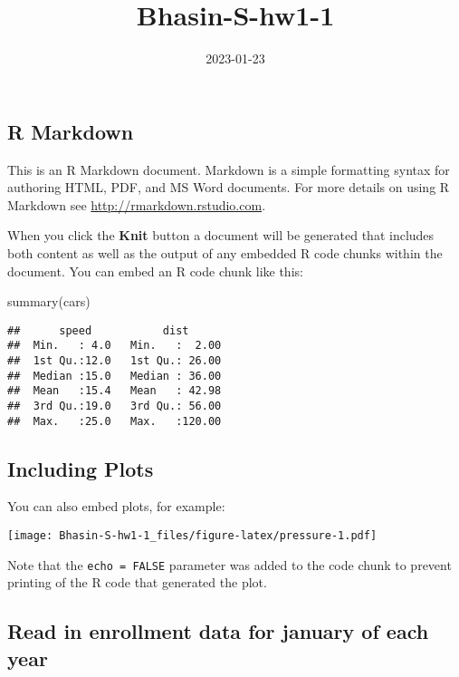 \documentclass[
]{article}
\title{Bhasin-S-hw1-1}
\author{}
\date{\vspace{-2.5em}2023-01-23}
\newenvironment{Shaded}{\begin{snugshade}}{\end{snugshade}}
\newcommand{\FunctionTok}[1]{\textcolor[rgb]{0.00,0.00,0.00}{#1}}
\newcommand{\NormalTok}[1]{#1}
\begin{document}
\maketitle

\hypertarget{r-markdown}{%
\subsection{R Markdown}\label{r-markdown}}

This is an R Markdown document. Markdown is a simple formatting syntax
for authoring HTML, PDF, and MS Word documents. For more details on
using R Markdown see \url{http://rmarkdown.rstudio.com}.

When you click the \textbf{Knit} button a document will be generated
that includes both content as well as the output of any embedded R code
chunks within the document. You can embed an R code chunk like this:

\begin{Shaded}
\begin{Highlighting}[]
\FunctionTok{summary}\NormalTok{(cars)}
\end{Highlighting}
\end{Shaded}

\begin{verbatim}
##      speed           dist       
##  Min.   : 4.0   Min.   :  2.00  
##  1st Qu.:12.0   1st Qu.: 26.00  
##  Median :15.0   Median : 36.00  
##  Mean   :15.4   Mean   : 42.98  
##  3rd Qu.:19.0   3rd Qu.: 56.00  
##  Max.   :25.0   Max.   :120.00
\end{verbatim}

\hypertarget{including-plots}{%
\subsection{Including Plots}\label{including-plots}}

You can also embed plots, for example:

\texttt{[image: Bhasin-S-hw1-1\_files/figure-latex/pressure-1.pdf]}

Note that the \texttt{echo\ =\ FALSE} parameter was added to the code
chunk to prevent printing of the R code that generated the plot.

\hypertarget{read-in-enrollment-data-for-january-of-each-year}{%
\subsection{Read in enrollment data for january of each
year}\label{read-in-enrollment-data-for-january-of-each-year}}
\end{document}
